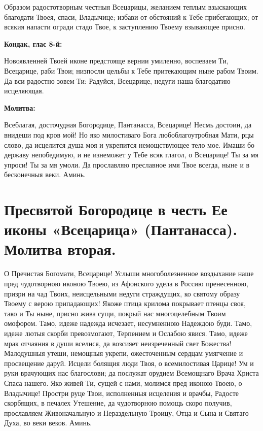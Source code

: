 Образом радостотворным честныя Всецарицы, желанием теплым взыскающих благодати Твоея, спаси, Владычице; избави от обстояний к Тебе прибегающих; от всякия напасти огради стадо Твое, к заступлению Твоему взывающее присно.


\medskip


\bfseries Кондак, глас 8-й:\normalfont{}\nopagebreak


Новоявленней Твоей иконе предстояще вернии умиленно, воспеваем Ти, Всецарице, раби Твои; низпосли цельбы к Тебе притекающим ныне рабом Твоим. Да вси радостно зовем Ти: Радуйся, Всецарице, недуги наша благодатию исцеляющая.


\medskip


\bfseries Молитва:\normalfont{}\nopagebreak


Всеблагая, досточудная Богородице, Пантанасса, Всецарице! Несмь достоин, да внидеши под кров мой! Но яко милостиваго Бога любоблагоутробная Мати, рцы слово, да исцелится душа моя и укрепится немощствующее тело мое. Имаши бо державу непобедимую, и не изнеможет у Тебе всяк глагол, о Всецарице! Ты за мя упроси! Ты за мя умоли. Да прославляю преславное имя Твое всегда, ныне и в бесконечныя веки. Аминь.


\section{Пресвятой Богородице в честь Ее иконы «Всецарица» (Пантанасса). Молитва вторая.}
 


О Пречистая Богомати, Всецарице! Услыши многоболезненное воздыхание наше пред чудотворною иконою Твоею, из Афонского удела в Россию пренесенною, призри на чад Твоих, неисцельными недуги страждущих, ко святому образу Твоему с верою припадающих! Якоже птица крилома покрывает птенцы своя, тако и Ты ныне, присно жива сущи, покрый нас многоцелебным Твоим омофором. Тамо, идеже надежда исчезает, несумненною Надеждою буди. Тамо, идеже лютыя скорби превозмогают, Терпением и Ослабою явися. Тамо, идеже мрак отчаяния в души вселися, да возсияет неизреченный свет Божества! Малодушныя утеши, немощныя укрепи, ожесточенным сердцам умягчение и просвещение даруй. Исцели болящия люди Твоя, о всемилостивая Царице! Ум и руки врачующих нас благослови; да послужат орудием Всемощнаго Врача Христа Спаса нашего. Яко живей Ти, сущей с нами, молимся пред иконою Твоею, о Владычице! Простри руце Твои, исполненныя исцеления и врачбы, Радосте скорбящих, в печалех Утешение, да чудотворною помощь скоро получив, прославляем Живоначальную и Нераздельную Троицу, Отца и Сына и Святаго Духа, во веки веков. Аминь.


